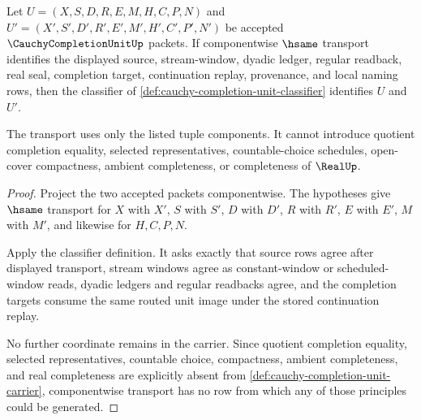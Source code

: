 \begin{theorem}
\label{thm:cauchy-completion-unit-classifier-stability}
Let $U=(X,S,D,R,E,M,H,C,P,N)$ and $U'=(X',S',D',R',E',M',H',C',P',N')$ be accepted $\CauchyCompletionUnitUp$ packets. If componentwise $\hsame$ transport identifies the displayed source, stream-window, dyadic ledger, regular readback, real seal, completion target, continuation replay, provenance, and local naming rows, then the classifier of \autoref{def:cauchy-completion-unit-classifier} identifies $U$ and $U'$.

The transport uses only the listed tuple components. It cannot introduce quotient completion equality, selected representatives, countable-choice schedules, open-cover compactness, ambient completeness, or completeness of $\RealUp$.
\end{theorem}
\begin{proof}
Project the two accepted packets componentwise. The hypotheses give $\hsame$ transport for $X$ with $X'$, $S$ with $S'$, $D$ with $D'$, $R$ with $R'$, $E$ with $E'$, $M$ with $M'$, and likewise for $H,C,P,N$.

Apply the classifier definition. It asks exactly that source rows agree after displayed transport, stream windows agree as constant-window or scheduled-window reads, dyadic ledgers and regular readbacks agree, and the completion targets consume the same routed unit image under the stored continuation replay.

No further coordinate remains in the carrier. Since quotient completion equality, selected representatives, countable choice, compactness, ambient completeness, and real completeness are explicitly absent from \autoref{def:cauchy-completion-unit-carrier}, componentwise transport has no row from which any of those principles could be generated.
\end{proof}

